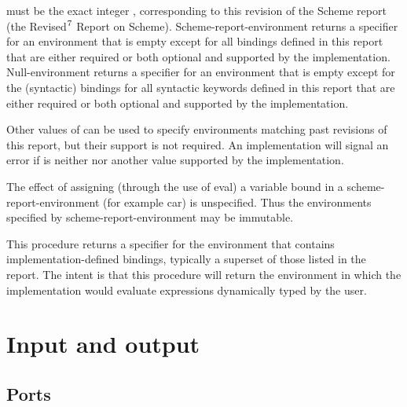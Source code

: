 \begin{entry}{%
}

 must be the exact integer {\cf \integerversion},
corresponding to this revision of the Scheme report (the
Revised$^7$ Report on Scheme).
{\cf Scheme-report-environment} returns a specifier for an
environment that is empty except for all bindings defined in
this report that are either required or both optional and
supported by the implementation. {\cf Null-environment} returns
a specifier for an environment that is empty except for the
(syntactic) bindings for all syntactic keywords defined in
this report that are either required or both optional and
supported by the implementation.

Other values of  can be used to specify environments
matching past revisions of this report, but their support is not
required.  An implementation will signal an error if 
is neither {\cf \integerversion} nor another value supported by
the implementation.

The effect of assigning (through the use of {\cf eval}) a variable
bound in a {\cf scheme-report-environment}
(for example {\cf car}) is unspecified.  Thus the environments specified
by {\cf scheme-report-environment} may be immutable.

\end{entry}

\begin{entry}{%
}

This procedure returns a specifier for the environment that
contains imple\-men\-ta\-tion-defined bindings, typically a superset of
those listed in the report.  The intent is that this procedure
will return the environment in which the implementation would evaluate
expressions dynamically typed by the user.

\end{entry}

\section{Input and output}

\subsection{Ports}
\label{portsection}

